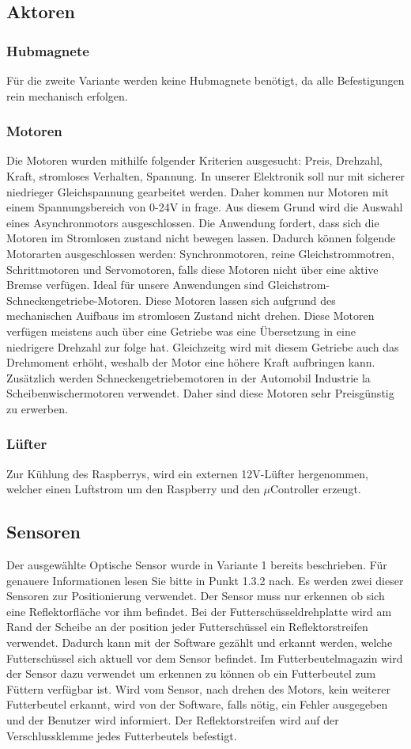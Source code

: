 \subsection{Aktoren}
\subsubsection{Hubmagnete}
Für die zweite Variante werden keine Hubmagnete benötigt, da alle Befestigungen rein mechanisch erfolgen.

\subsubsection{Motoren}
Die Motoren wurden mithilfe folgender Kriterien ausgesucht: Preis, Drehzahl, Kraft, stromloses Verhalten, Spannung.
In unserer Elektronik soll nur mit sicherer niedrieger Gleichspannung gearbeitet werden. Daher kommen nur Motoren mit einem Spannungsbereich von 0-24V in frage. Aus diesem Grund wird die Auswahl eines Asynchronmotors ausgeschlossen. Die Anwendung fordert, dass sich die Motoren im Stromlosen zustand nicht bewegen lassen. Dadurch können folgende Motorarten ausgeschlossen werden: Synchronmotoren, reine Gleichstrommotren, Schrittmotoren und Servomotoren, falls diese Motoren nicht über eine aktive Bremse verfügen. Ideal für unsere Anwendungen sind Gleichstrom-Schneckengetriebe-Motoren. Diese Motoren lassen sich aufgrund des mechanischen Auifbaus im stromlosen Zustand nicht drehen. Diese Motoren verfügen meistens auch über eine Getriebe was eine Übersetzung in eine niedrigere Drehzahl zur folge hat. Gleichzeitg wird mit diesem Getriebe auch das Drehmoment erhöht, weshalb der Motor eine höhere Kraft aufbringen kann. Zusätzlich werden Schneckengetriebemotoren in der Automobil Industrie la Scheibenwischermotoren verwendet. Daher sind diese Motoren sehr Preisgünstig zu erwerben.

\subsubsection{Lüfter}
Zur Kühlung des Raspberrys, wird ein externen 12V-Lüfter hergenommen, welcher einen Luftstrom um den Raspberry und den $\mu$Controller erzeugt.
\subsection{Sensoren}
Der ausgewählte Optische Sensor wurde in Variante 1 bereits beschrieben. Für genauere Informationen lesen Sie bitte in Punkt 1.3.2 nach.
Es werden zwei dieser Sensoren zur Positionierung verwendet. Der Sensor muss nur erkennen ob sich eine Reflektorfläche vor ihm befindet. Bei der Futterschüsseldrehplatte wird am Rand der Scheibe an der position jeder Futterschüssel ein Reflektorstreifen verwendet. Dadurch kann mit der Software gezählt und erkannt werden, welche Futterschüssel sich aktuell vor dem Sensor befindet. Im Futterbeutelmagazin wird der Sensor dazu verwendet um erkennen zu können ob ein Futterbeutel zum Füttern verfügbar ist. Wird vom Sensor, nach drehen des Motors, kein weiterer Futterbeutel erkannt, wird von der Software, falls nötig, ein Fehler ausgegeben und der Benutzer wird informiert. Der Reflektorstreifen wird auf der Verschlussklemme jedes Futterbeutels befestigt.
